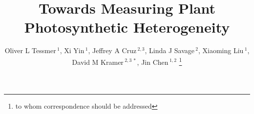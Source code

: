 \documentclass{bioinfo}
\begin{document}

\title{Towards Measuring Plant Photosynthetic Heterogeneity}
\author[Tessmer \textit{et~al}]{Oliver L Tessmer\,$^{1}$, Xi Yin\,$^{1}$, Jeffrey A Cruz\,$^{2,3}$, Linda J Savage\,$^{2}$, Xiaoming Liu\,$^{1}$, David M Kramer\,$^{2,3~\ast}$, Jin Chen\,$^{1,2}$ \footnote{to whom correspondence should be addressed}}
\address{$^{1}$Department of Computer Science and Engineering, Michigan State University, East Lansing, MI 48824, USA\\
$^{2}$Department of Energy Plant Research Laboratory, Michigan State University, East Lansing, MI 48824, USA\\
$^{3}$Department of Biochemistry and Molecular Biology, Michigan State University, East Lansing, MI 48824, USA}



\maketitle
\end{document}
